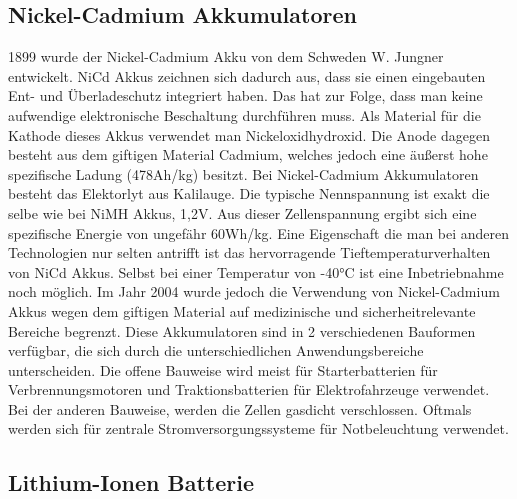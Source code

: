 \subsection{Nickel-Cadmium Akkumulatoren}
1899 wurde der Nickel-Cadmium Akku von dem Schweden W. Jungner entwickelt. NiCd Akkus zeichnen sich dadurch aus, dass sie einen eingebauten Ent- und Überladeschutz integriert haben. Das hat zur Folge, dass man keine aufwendige elektronische Beschaltung durchführen muss. Als Material für die Kathode dieses Akkus verwendet man Nickeloxidhydroxid. Die Anode dagegen besteht aus dem giftigen Material Cadmium, welches jedoch eine äußerst hohe spezifische Ladung (478Ah/kg) besitzt. Bei Nickel-Cadmium Akkumulatoren besteht das Elektorlyt aus Kalilauge. Die typische Nennspannung ist exakt die selbe wie bei NiMH Akkus, 1,2V. Aus dieser Zellenspannung ergibt sich eine spezifische Energie von ungefähr 60Wh/kg. Eine Eigenschaft die man bei anderen Technologien nur selten antrifft ist das hervorragende Tieftemperaturverhalten von NiCd Akkus. Selbst bei einer Temperatur von -40°C ist eine Inbetriebnahme noch möglich. Im Jahr 2004 wurde jedoch die Verwendung von Nickel-Cadmium Akkus wegen dem giftigen Material auf medizinische und sicherheitrelevante Bereiche begrenzt. Diese Akkumulatoren sind in 2 verschiedenen Bauformen verfügbar, die sich durch die unterschiedlichen Anwendungsbereiche unterscheiden. Die offene Bauweise wird meist für Starterbatterien für Verbrennungsmotoren und Traktionsbatterien für Elektrofahrzeuge verwendet. Bei der anderen Bauweise, werden die Zellen gasdicht verschlossen. Oftmals werden sich für zentrale Stromversorgungssysteme für Notbeleuchtung verwendet.
\newpage

\subsection{Lithium-Ionen Batterie}
